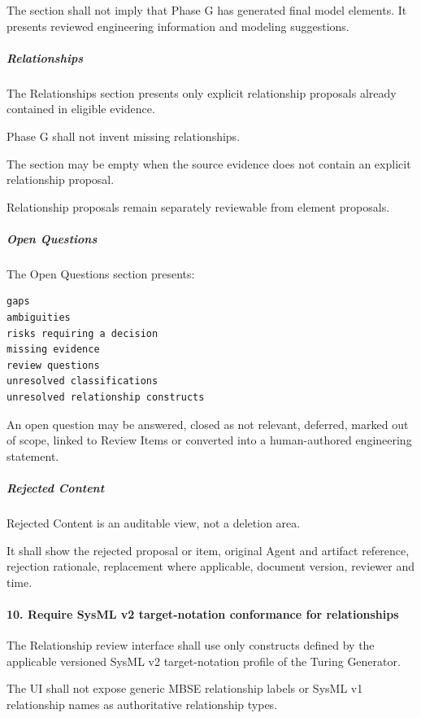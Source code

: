 The section shall not imply that Phase G has generated final model elements. It presents reviewed engineering information and modeling suggestions.

\hypertarget{relationships}{%
\subparagraph{Relationships}\label{relationships}}

The Relationships section presents only explicit relationship proposals already contained in eligible evidence.

Phase G shall not invent missing relationships.

The section may be empty when the source evidence does not contain an explicit relationship proposal.

Relationship proposals remain separately reviewable from element proposals.

\hypertarget{open-questions}{%
\subparagraph{Open Questions}\label{open-questions}}

The Open Questions section presents:

\begin{verbatim}
gaps
ambiguities
risks requiring a decision
missing evidence
review questions
unresolved classifications
unresolved relationship constructs
\end{verbatim}

An open question may be answered, closed as not relevant, deferred, marked out of scope, linked to Review Items or converted into a human-authored engineering statement.

\hypertarget{rejected-content}{%
\subparagraph{Rejected Content}\label{rejected-content}}

Rejected Content is an auditable view, not a deletion area.

It shall show the rejected proposal or item, original Agent and artifact reference, rejection rationale, replacement where applicable, document version, reviewer and time.

\hypertarget{10-require-sysml-v2-target-notation-conformance-for-relationships}{%
\paragraph{10. Require SysML v2 target-notation conformance for relationships}\label{10-require-sysml-v2-target-notation-conformance-for-relationships}}

The Relationship review interface shall use only constructs defined by the applicable versioned SysML v2 target-notation profile of the Turing Generator.

The UI shall not expose generic MBSE relationship labels or SysML v1 relationship names as authoritative relationship types.

